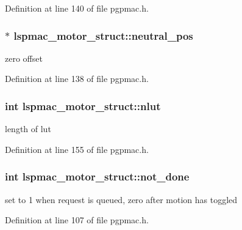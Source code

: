 Definition at line 140 of file pgpmac.\-h.

\hypertarget{structlspmac__motor__struct_ae931e9bc9fc2fa82ca649334fc052fbe}{
\subsubsection[{neutral\-\_\-pos}]{$\ast$ lspmac\-\_\-motor\-\_\-struct\-::neutral\-\_\-pos}}\label{structlspmac__motor__struct_ae931e9bc9fc2fa82ca649334fc052fbe}


zero offset 



Definition at line 138 of file pgpmac.\-h.

\hypertarget{structlspmac__motor__struct_a11cbc6f50c150ed446e9a901cf7cc12b}{
\subsubsection[{nlut}]{\setlength{\rightskip}{0pt plus 5cm}int lspmac\-\_\-motor\-\_\-struct\-::nlut}}\label{structlspmac__motor__struct_a11cbc6f50c150ed446e9a901cf7cc12b}


length of lut 



Definition at line 155 of file pgpmac.\-h.

\hypertarget{structlspmac__motor__struct_ab7bd8bff48953ce05c758598d75877ac}{
\subsubsection[{not\-\_\-done}]{\setlength{\rightskip}{0pt plus 5cm}int lspmac\-\_\-motor\-\_\-struct\-::not\-\_\-done}}\label{structlspmac__motor__struct_ab7bd8bff48953ce05c758598d75877ac}


set to 1 when request is queued, zero after motion has toggled 



Definition at line 107 of file pgpmac.\-h.


